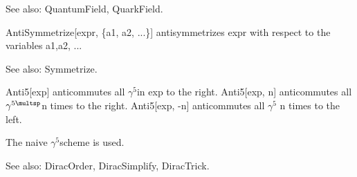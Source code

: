 See also:  QuantumField, QuarkField.



\dispSFoutmath{
\overvar{\psi }{\_}
}



AntiSymmetrize[expr, \{a1, a2, ...\}] antisymmetrizes expr with respect to the variables a1,a2, ...

See also: Symmetrize.








Anti5[exp] anticommutes all \({{\gamma }^5}\)in exp to the right. Anti5[exp, n] anticommutes all \({{\gamma }^{5\multsp }}\)n times to the right.
Anti5[exp, -n] anticommutes all \({{\gamma }^5}\) n times to the left.

The naive \({{\gamma }^5}\)scheme is used.

See also:  DiracOrder, DiracSimplify, DiracTrick.










